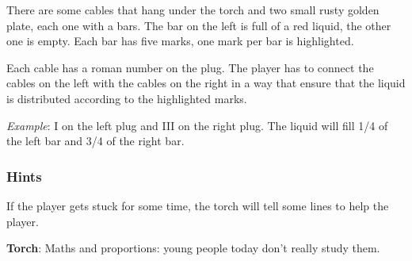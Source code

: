 
There are some cables that hang under the torch and two small rusty golden plate, each one with a bars. The bar on the left is full of a red liquid, the other one is empty. Each bar has five marks, one mark per bar is highlighted.

Each cable has a roman number on the plug. The player has to connect the cables on the left with the cables on the right in a way that ensure that the liquid is distributed according to the highlighted marks.

\textit{Example}: I on the left plug and III on the right plug. The liquid will fill 1/4 of the left bar and 3/4 of the right bar.

\subsubsection*{Hints}
If the player gets stuck for some time, the torch will tell some lines to help the player.

\textbf{Torch}: Maths and proportions: young people today don't really study them.
